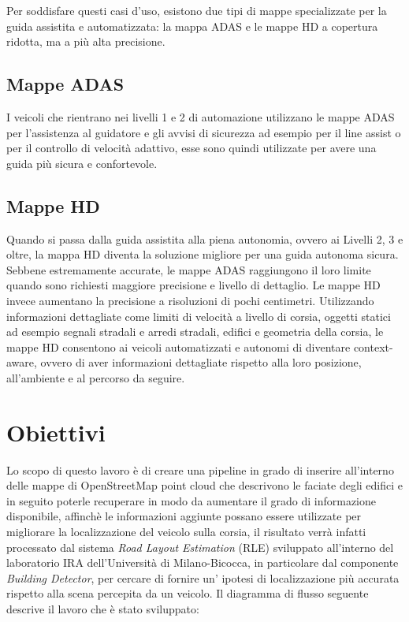 Per soddisfare questi casi d'uso, esistono due tipi di mappe specializzate per la guida assistita e automatizzata: la mappa ADAS e le mappe HD a copertura ridotta, ma a più alta precisione.

\subsection*{Mappe ADAS}
I veicoli che rientrano nei livelli 1 e 2 di automazione utilizzano le mappe ADAS per l'assistenza al guidatore e gli avvisi di sicurezza ad esempio per il line assist o per il controllo di velocità adattivo, esse sono quindi utilizzate per avere una guida più sicura e confortevole.

\subsection*{Mappe HD}
Quando si passa dalla guida assistita alla piena autonomia, ovvero ai Livelli 2, 3 e oltre, la mappa HD diventa la soluzione migliore per una guida autonoma sicura. Sebbene estremamente accurate, le mappe ADAS raggiungono il loro limite quando sono richiesti maggiore precisione e livello di dettaglio.
Le mappe HD invece aumentano la precisione a risoluzioni di pochi centimetri. Utilizzando informazioni dettagliate come limiti di velocità a livello di corsia, oggetti statici ad esempio segnali stradali e arredi stradali, edifici e geometria della corsia, le mappe HD consentono ai veicoli automatizzati e autonomi di diventare context-aware, ovvero di aver informazioni dettagliate rispetto alla loro posizione, all'ambiente e al percorso da seguire.

\section*{Obiettivi}
Lo scopo di questo lavoro è di creare una pipeline in grado di inserire all'interno delle mappe di OpenStreetMap point cloud che descrivono le faciate degli edifici e in seguito poterle recuperare in modo da aumentare il grado di informazione disponibile, affinchè le informazioni aggiunte possano essere utilizzate per migliorare la localizzazione del veicolo sulla corsia, il risultato verrà infatti processato dal sistema \textit{Road Layout Estimation} (RLE) sviluppato all'interno del laboratorio IRA dell'Università di Milano-Bicocca, in particolare dal componente \textit{Building Detector}\cite{7795618}, per cercare di fornire un' ipotesi di localizzazione più accurata rispetto alla scena percepita da un veicolo.
Il diagramma di flusso seguente descrive il lavoro che è stato sviluppato:

